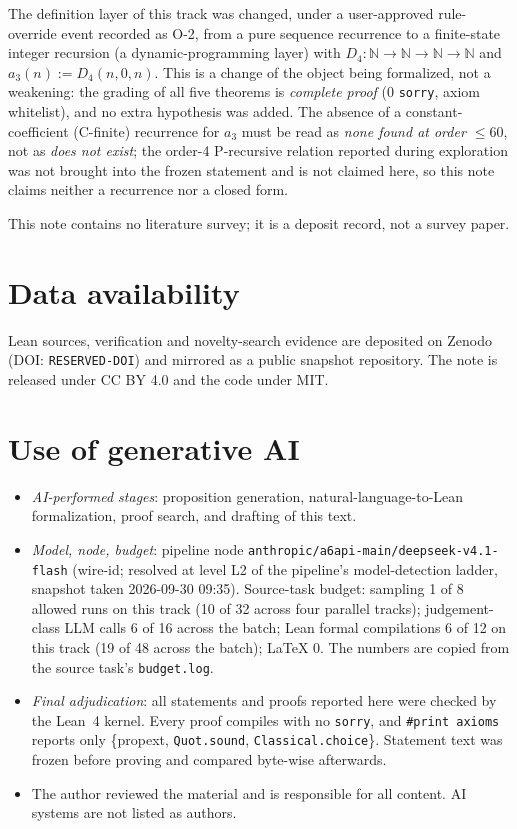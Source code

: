 \documentclass[11pt]{article}
\begin{document}
The definition layer of this track was changed, under a user-approved rule-override event
recorded as O-2, from a pure sequence recurrence to a finite-state integer recursion (a
dynamic-programming layer) with $D_4\colon \mathbb{N}\to\mathbb{N}\to\mathbb{N}\to\mathbb{N}$
and $a_3(n) := D_4(n,0,n)$. This is a change of the object being formalized, not a weakening:
the grading of all five theorems is \emph{complete proof} (0 \texttt{sorry}, axiom whitelist),
and no extra hypothesis was added. The absence of a constant-coefficient (C-finite) recurrence
for $a_3$ must be read as \emph{none found at order $\le 60$}, not as \emph{does not exist};
the order-4 P-recursive relation reported during exploration was not brought into the frozen
statement and is not claimed here, so this note claims neither a recurrence nor a closed form.

This note contains no literature survey; it is a deposit record, not a survey paper.

\section*{Data availability}
Lean sources, verification and novelty-search evidence are deposited on Zenodo
(DOI: \texttt{RESERVED-DOI}) and mirrored as a public snapshot repository. The note is
released under CC BY 4.0 and the code under MIT.

\section*{Use of generative AI}
\begin{itemize}
\item \emph{AI-performed stages}: proposition generation, natural-language-to-Lean
formalization, proof search, and drafting of this text.
\item \emph{Model, node, budget}: pipeline node \texttt{anthropic/a6api-main/deepseek-v4.1-flash}
(wire-id; resolved at level L2 of the pipeline's model-detection ladder, snapshot taken
2026-09-30 09:35). Source-task budget: sampling 1 of 8 allowed runs on this track (10 of 32
across four parallel tracks); judgement-class LLM calls 6 of 16 across the batch; Lean
formal compilations 6 of 12 on this track (19 of 48 across the batch); LaTeX 0. The numbers are
copied from the source task's \texttt{budget.log}.
\item \emph{Final adjudication}: all statements and proofs reported here were checked by the
Lean~4 kernel. Every proof compiles with no \texttt{sorry}, and \texttt{\#print axioms}
reports only \{propext, \texttt{Quot.sound}, \texttt{Classical.choice}\}. Statement text was
frozen before proving and compared byte-wise afterwards.
\item The author reviewed the material and is responsible for all content. AI systems are
not listed as authors.
\end{itemize}
\end{document}
